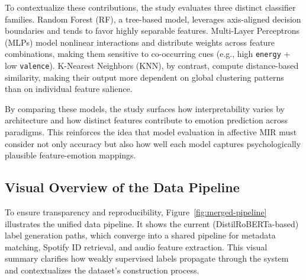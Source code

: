 \documentclass{article}
\begin{document}
To contextualize these contributions, the study evaluates three distinct classifier families. Random Forest (RF), a tree-based model, leverages axis-aligned decision boundaries and tends to favor highly separable features. Multi-Layer Perceptrons (MLPs) model nonlinear interactions and distribute weights across feature combinations, making them sensitive to co-occurring cues (e.g., high \texttt{energy} + low \texttt{valence}). K-Nearest Neighbors (KNN), by contrast, compute distance-based similarity, making their output more dependent on global clustering patterns than on individual feature salience.

By comparing these models, the study surfaces how interpretability varies by architecture and how distinct features contribute to emotion prediction across paradigms. This reinforces the idea that model evaluation in affective MIR must consider not only accuracy but also how well each model captures psychologically plausible feature-emotion mappings.

\subsection{Visual Overview of the Data Pipeline}

To ensure transparency and reproducibility, Figure~\ref{fig:merged-pipeline} illustrates the unified data pipeline. It shows the current (DistilRoBERTa-based) label generation paths, which converge into a shared pipeline for metadata matching, Spotify ID retrieval, and audio feature extraction. This visual summary clarifies how weakly supervised labels propagate through the system and contextualizes the dataset's construction process.
\end{document}
